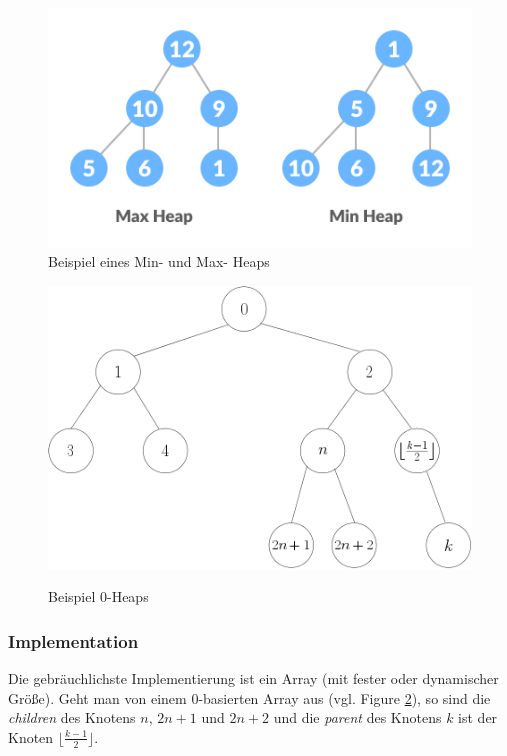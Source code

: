 \documentclass[a4paper]{article}
\begin{document}
\begin{figure}[h] 
\caption{Beispiel eines Min- und Max- Heaps}
\centering
\label{fig: Min/Max-heap}
\includegraphics[scale= 0.7]{Pictures/max-heap-min-heap.png}
\end{figure}

\begin{figure}[h] 
\caption{Beispiel 0-Heaps}
\centering
\includegraphics[scale= 0.5]{Pictures/0-heap.png}
\label{fig: 0-Heap}
\end{figure}



\subsubsection*{Implementation}
Die gebräuchlichste Implementierung ist ein Array (mit fester oder dynamischer Größe). Geht man von einem 0-basierten Array aus (vgl. Figure \ref{fig: 0-Heap}), so sind die \textit{children} des Knotens $n$, $2n+1$ und $2n+2$ und die \textit{parent} des Knotens $k$ ist der Knoten $\lfloor \frac{k-1}{2}\rfloor$.
\end{document}
